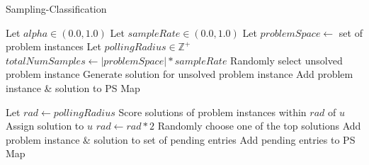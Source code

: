 




\begin{algorithm}
\caption{Sampling-Classification}   
\label{alg:sc}
\small
\begin{algorithmic}[1] 
  
  \State Let $alpha \in (0.0,1.0)$
  \State Let $sampleRate \in (0.0,1.0)$
  \State Let $problemSpace \leftarrow$ set of problem instances
  \State Let $pollingRadius \in \mathbb{Z}^+$ 
  \State $totalNumSamples \leftarrow |problemSpace| * sampleRate$
    \State Randomly select unsolved problem instance
    \State Generate solution for unsolved problem instance
    \State Add problem instance \& solution to PS Map
  \EndFor

    \State Let $rad \leftarrow pollingRadius$
      \State Score solutions of problem instances within $rad$ of $u$
        \State Assign solution to $u$
      \Else 
        \State $rad \leftarrow rad * 2$
      \EndIf
    \EndWhile
      \State Randomly choose one of the top solutions
    \EndIf
    \State Add problem instance \& solution to set of pending entries 
  \EndFor
  \State Add pending entries to PS Map 
\end{algorithmic}
\end{algorithm}


